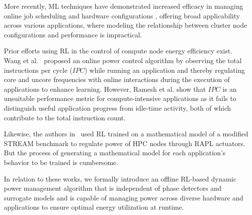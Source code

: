 More recently, ML techniques have demonstrated increased efficacy in managing online job scheduling and hardware configurations \cite{chen2015distributed,10571824}, offering broad applicability across various applications, where modeling the relationship between cluster node configurations and performance is impractical.

Prior efforts using RL in the control of compute node energy efficiency exist. Wang et al.~\cite{10.1145/3716872} proposed an online power control algorithm by observing the total instructions per cycle ($IPC$)  while running an application and thereby regulating core and uncore frequencies with online interactions during the execution of applications to enhance learning. However, Ramesh et al. \cite{ramesh2019understanding} show that $IPC$ is an unsuitable performance metric for compute-intensive applications as it fails to distinguish useful application progress from idle-time activity, both of which contribute to the total instruction count. 

Likewise, the authors in~\cite{10305814} used RL trained on a mathematical model of a modified STREAM benchmark to regulate power of HPC nodes through RAPL actuators. But the process of generating a mathematical model for each  application's behavior to be trained is cumbersome. 

In relation to these works,  we formally introduce an offline RL-based dynamic power management algorithm that is independent of phase detectors and surrogate models and is capable of managing power across diverse hardware and applications to ensure optimal energy utilization at runtime.



